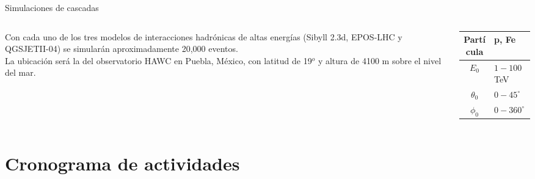 \documentclass[10pt,xcolor=table]{beamer}
\begin{document}
\begin{frame}{Simulaciones de cascadas}
	\begin{columns}
		\begin{column}{0.6\textwidth}
		Con cada uno de los tres modelos de interacciones hadrónicas de altas energías (Sibyll 2.3d, EPOS-LHC y QGSJETII-04) se simular\'an aproximadamente 20,000 eventos. \\ \vspace{0.5 cm}
		La ubicaci\'on ser\'a la del observatorio HAWC en Puebla, M\'exico, con latitud de 19$^{o}$ y altura de 4100 m sobre el nivel del mar.
		\end{column}
		
		\begin{column}{0.4\textwidth}
		\begin{block}
		
			\begin{table}[]
				\begin{tabular}{@{}cl@{}}
				{\color[HTML]{0E3EF0} Part\'icula} & p, Fe           \\ \midrule
				{\color[HTML]{0E3EF0} $E_0$}       & $1-100$ TeV     \\ \midrule
				{\color[HTML]{0E3EF0} $\theta_0$}  & $0-45^{\circ}$  \\ \midrule
				{\color[HTML]{0E3EF0} $\phi_0$}    & $0-360^{\circ}$
				\end{tabular}
			\end{table}
		\end{block}
		\end{column}
	\end{columns}
\end{frame}

\section{Cronograma de actividades}
\end{document}
